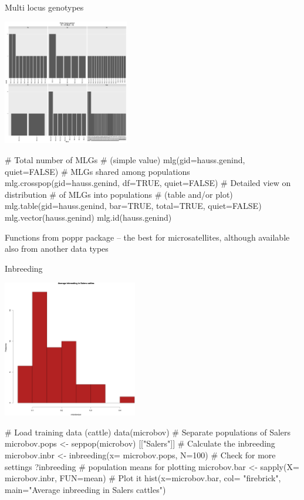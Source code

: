 \documentclass[compress, ucs, xelatex, 11pt, xcolor=svgnames,
  hyperref={
    bookmarks=true,
    unicode=true,
    colorlinks=true,
    pdftitle={Molecular data in R},
    plainpages=false,
    pdfauthor={Vojtech Zeisek},
    pdfsubject={Course about phylogeny and evolution in R},
    pdfcreator={XeLaTeX},
    pdfkeywords={R, evolution, phylogeny, molecular data},
    linkcolor=Tomato,
    anchorcolor=SaddleBrown,
    citecolor=Goldenrod,
    filecolor=DarkMagenta,
    menucolor=Sienna,
    urlcolor=DarkTurquoise,
    pdftex},
  url={hyphens, lowtilde} %
  ]{beamer}
\begin{document}
\begin{frame}[fragile]{Multi locus genotypes}
  \begin{multicols}{2}
  \includegraphics[height=5.5cm]{mlg.png}
  \begin{spluscode}
    # Total number of MLGs
    # (simple value)
    mlg(gid=hauss.genind, quiet=FALSE)
    # MLGs shared among populations
    mlg.crosspop(gid=hauss.genind,
      df=TRUE, quiet=FALSE)
    # Detailed view on distribution
    # of MLGs into populations
    # (table and/or plot)
    mlg.table(gid=hauss.genind,
      bar=TRUE, total=TRUE,
      quiet=FALSE)
    mlg.vector(hauss.genind)
    mlg.id(hauss.genind)
  \end{spluscode}
  \end{multicols}
Functions from poppr package -- the best for microsatellites, although available also from another data types
\end{frame}

\begin{frame}[fragile]{Inbreeding}
\begin{multicols}{2}
  \includegraphics[height=6cm]{inbreeding.png}
  \begin{spluscode}
    # Load training data (cattle)
    data(microbov)
    # Separate populations of Salers
    microbov.pops <- seppop(microbov)
      [["Salers"]]
    # Calculate the inbreeding
    microbov.inbr <- inbreeding(x=
      microbov.pops, N=100)
    # Check for more settings
    ?inbreeding
    # population means for plotting
    microbov.bar <- sapply(X=
      microbov.inbr, FUN=mean)
    # Plot it
    hist(x=microbov.bar, col=
      "firebrick", main="Average
      inbreeding in Salers cattles")
  \end{spluscode}
\end{multicols}

\end{frame}
\end{document}
